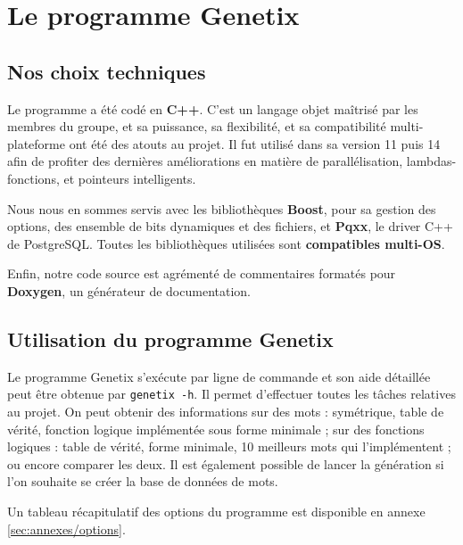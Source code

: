 \section{Le programme Genetix}
\label{sec:technique/genetix}

\subsection{Nos choix techniques}
\label{subsec:technique/genetix/choix}
\par
Le programme a été codé en \textbf{C++}. C'est un langage objet maîtrisé par les membres du groupe, et sa puissance, sa flexibilité, et sa compatibilité multi-plateforme ont été des atouts au projet. Il fut utilisé dans sa version 11 puis 14 afin de profiter des dernières améliorations en matière de parallélisation, lambdas-fonctions, et pointeurs intelligents.
\par
Nous nous en sommes servis avec les bibliothèques \textbf{Boost}, pour sa gestion des options, des ensemble de bits dynamiques et des fichiers, et \textbf{Pqxx}, le driver C++ de PostgreSQL. Toutes les bibliothèques utilisées sont \textbf{compatibles multi-OS}.
\par
Enfin, notre code source est agrémenté de commentaires formatés pour \textbf{Doxygen}, un générateur de documentation.

\subsection{Utilisation du programme Genetix}
\label{subsec:technique/genetix/utilisation}
\par
Le programme Genetix s'exécute par ligne de commande et son aide détaillée peut être obtenue par \texttt{genetix -h}. Il permet d'effectuer toutes les tâches relatives au projet. On peut obtenir des informations sur des mots : symétrique, table de vérité, fonction logique implémentée sous forme minimale ; sur des fonctions logiques : table de vérité, forme minimale, 10 meilleurs mots qui l'implémentent ; ou encore comparer les deux. Il est également possible de lancer la génération si l'on souhaite se créer la base de données de mots.
\par
Un tableau récapitulatif des options du programme est disponible en annexe \ref{sec:annexes/options}.